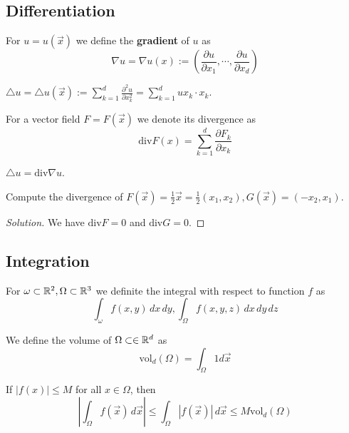 \subsection{Differentiation}
\begin{definition}
	For $u = u(\vec x)$ we define the \textbf{gradient} of $u$ as
	\[ \nabla u = \nabla u(x) := \left( \frac{\partial u}{\partial x_1}, \cdots, \frac{\partial u}{\partial x_d} \right) \]
\end{definition}
\begin{definition}
 $\triangle u = \triangle u(\vec x) := \sum_{k=1}^{d} \frac{\partial^2 u}{\partial x^2_k} = \sum_{k=1}^{d} u x_k \cdot x_k$.
\end{definition}
\begin{definition}
	For a vector field $F = F(\vec x)$ we denote its divergence as
	\[ \mathrm{div} F(x) = \sum_{k=1}^{d} \frac{\partial F_k}{\partial x_k}\] 
\end{definition}
\begin{remark}
	$\triangle u = \mathrm{div} \nabla u$.
\end{remark}
\begin{exercise}
	Compute the divergence of $F(\vec x) = \frac 12 \vec x = \frac 12(x_1, x_2), G(\vec x) = (-x_2, x_1)$.
\end{exercise}
\begin{proof}[Solution]
	We have $\mathrm{div}F = 0$ and $\mathrm{div} G = 0$.
\end{proof}
\subsection{Integration}
\begin{definition}
	For $\omega \subset \mathbb R^2, \Omega \subset \mathbb R^3$ we definite the integral with respect to function $f$ as
	\[ \int_\omega f(x,y) \,dx\,dy, \int_{\Omega} f(x,y,z)\, dx\,dy\,dz\]
\end{definition}
\begin{definition}
	We define the volume of $\Omega \subset \in \mathbb R^d$ as
	\[ \mathrm{vol}_d(\Omega) = \int_\Omega 1 d\vec x \]
\end{definition}
\begin{remark}
	If $|f(x)| \leq M$ for all $x \in \Omega$, then
	\[ \left|\int_\Omega f(\vec x) \,d \vec x \right|\leq \int_\Omega |f(\vec x)|\,d\vec x \leq M \mathrm{vol}_d(\Omega)\]
\end{remark}
